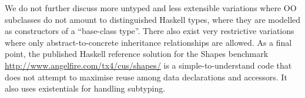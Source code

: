 We do not further discuss more untyped and less extensible variations
where OO subclasses do not amount to distinguished Haskell types,
where they are modelled as constructors of a ``base-class
type''. There also exist very restrictive variations where only
abstract-to-concrete inheritance relationships are allowed. As a final
point, the published Haskell reference solution for the Shapes
benchmark
\url{http://www.angelfire.com/tx4/cus/shapes/} is a simple-to-understand
code that does not attempt to maximise reuse among data declarations
and accessors. It also uses existentials for handling subtyping.
